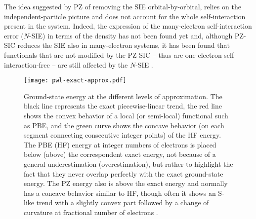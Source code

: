 The idea suggested by PZ of removing the SIE orbital-by-orbital, relies on the independent-particle picture and does not account for the whole self-interaction present in the system. Indeed, the expression of the many-electron self-interaction error ($N$-SIE) in terms of the density has not been found yet and, although PZ-SIC reduces the SIE also in many-electron systems, it has been found that functionals that are not modified by the PZ-SIC -- thus are one-electron self-interaction-free -- are still affected by the $N$-SIE \cite{cohen_challenges_2012, mori-sanchez_many-electron_2006}.
%
\begin{figure}
    \centering
    \texttt{[image: pwl-exact-approx.pdf]}
    \caption[Ground-state energy as a function of the number of electrons: comparison between the exact, the PBE, and the HF curves.]{Ground-state energy at the different levels of approximation. The black line represents the exact piecewise-linear trend, the red line shows the convex behavior of a local (or semi-local) functional such as PBE, and the green curve shows the concave behavior (on each segment connecting consecutive integer points) of the HF energy. The PBE (HF) energy at integer numbers of electrons is placed below (above) the correspondent exact energy, not because of a general underestimation (overestimation), but rather to highlight the fact that they never overlap perfectly with the exact ground-state energy. The PZ energy also is above the exact energy and normally has a concave behavior similar to HF, though often it shows an S-like trend with a slightly convex part followed by a change of curvature at fractional number of electrons \cite{vydrov_tests_2007}.}
    \label{fig:deviation-pwl}
\end{figure}

